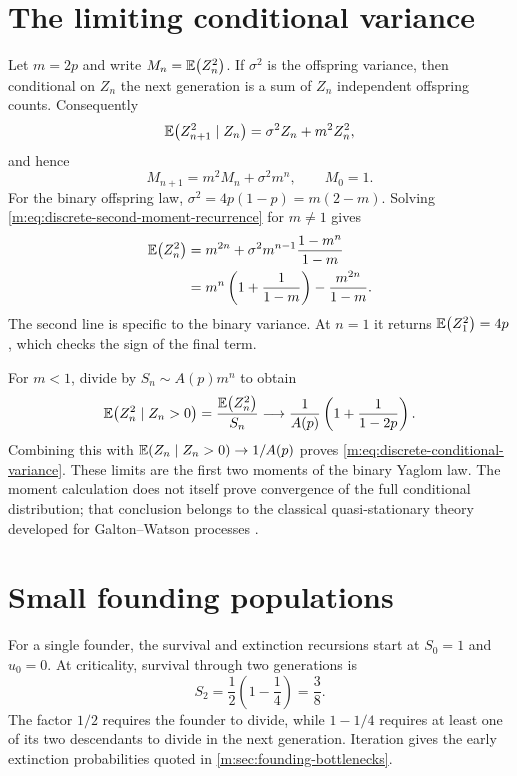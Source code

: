 \section{The limiting conditional variance}
\label{m:app:conditional-variance}

Let $m=2p$ and write $M_n=\mathbb{E}\!\left(Z_n^2\right)$.  If $\sigma^2$ is the offspring
variance, then conditional on $Z_n$ the next generation is a sum of $Z_n$
independent offspring counts.  Consequently
\begin{equation}
  \mathbb{E}\!\left(Z_{n+1}^2\mid Z_n\right)=\sigma^2Z_n+m^2Z_n^2,
\end{equation}
and hence
\begin{equation}
  M_{n+1}=m^2M_n+\sigma^2m^n,
  \qquad M_0=1.
  \label{m:eq:discrete-second-moment-recurrence}
\end{equation}
For the binary offspring law,
$\sigma^2=4p(1-p)=m(2-m)$.  Solving
\cref{m:eq:discrete-second-moment-recurrence} for $m\neq1$ gives
\begin{align}
  \mathbb{E}\!\left(Z_n^2\right)
  &=m^{2n}+\sigma^2m^{n-1}\frac{1-m^n}{1-m}
  \notag\\
  &=m^n\left(1+\frac{1}{1-m}\right)
    -\frac{m^{2n}}{1-m}.
  \label{m:eq:binary-second-moment}
\end{align}
The second line is specific to the binary variance.  At $n=1$ it returns
$\mathbb{E}\!\left(Z_1^2\right)=4p$, which checks the sign of the final term.

For $m<1$, divide by $S_n\sim A(p)m^n$ to obtain
\begin{equation}
  \mathbb{E}\!\left(Z_n^2\mid Z_n>0\right)
  =\frac{\mathbb{E}\!\left(Z_n^2\right)}{S_n}
  \longrightarrow
  \frac{1}{A(p)}\left(1+\frac{1}{1-2p}\right).
  \label{m:eq:qsd-second-moment}
\end{equation}
Combining this with
$\mathbb{E}\!\left(Z_n\mid Z_n>0\right)\to1/A(p)$ proves
\cref{m:eq:discrete-conditional-variance}.  These limits are the first two
moments of the binary Yaglom law.  The moment calculation does not itself prove
convergence of the full conditional distribution; that conclusion belongs to the
classical quasi-stationary theory developed for Galton--Watson processes
\cite{Harris1963,Athreya1972}.

\section{Small founding populations}
\label{m:app:small-populations}

For a single founder, the survival and extinction recursions start at $S_0=1$ and
$u_0=0$.  At criticality, survival through two generations is
\begin{equation}
  S_2=\frac12\left(1-\frac14\right)=\frac38.
  \label{m:eq:two-generation-survival}
\end{equation}
The factor $1/2$ requires the founder to divide, while $1-1/4$ requires at least
one of its two descendants to divide in the next generation.  Iteration gives the
early extinction probabilities quoted in \cref{m:sec:founding-bottlenecks}.

